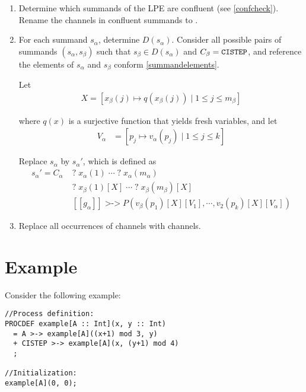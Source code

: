 \begin{enumerate}

\item Determine which \istep{} summands of the LPE are confluent (see \ref{confcheck}).
Rename the \istep{} channels in confluent \istep{} summands to \cistep{}.

\item For each summand $s_\alpha$, determine $D(s_\alpha)$.
Consider all possible pairs of summands $(s_\alpha, s_\beta)$ such that $s_\beta \in D(s_\alpha)$ and $C_\beta = \texttt{CISTEP}{}$, and reference the elements of $s_\alpha$ and $s_\beta$ conform \ref{summandelements}.

Let
\begin{align*}
X = [ x_\beta(j) \mapsto q(x_\beta(j)) \;|\; 1 \leq j \leq m_\beta ]
\end{align*}

where $q(x)$ is a surjective function that yields fresh variables, and let
\begin{align*}
V_\alpha &= [p_j \mapsto v_\alpha(p_j) \;|\; 1 \leq j \leq k]
\end{align*}

Replace $s_\alpha$ by ${s_\alpha}'$, which is defined as
\begin{align*}
{s_\alpha}' = C_\alpha \; &\texttt{?} \; x_\alpha(1) \; \cdots{} \; \texttt{?} \; x_\alpha(m_\alpha) \\
&\texttt{?} \; x_\beta(1)[X] \; \cdots{} \; \texttt{?} \; x_\beta(m_\beta)[X] \\
&[[g_\alpha]] \; \texttt{>->} \; P(v_\beta(p_1)[X][V_1], \cdots{}, v_2(p_k)[X][V_\alpha])
\end{align*}

\item Replace all occurrences of \cistep{} channels with \istep{} channels.
\end{enumerate}

\section{Example}

Consider the following example:

\begin{lstlisting}
//Process definition:
PROCDEF example[A :: Int](x, y :: Int)
  = A >-> example[A]((x+1) mod 3, y)
  + CISTEP >-> example[A](x, (y+1) mod 4)
  ;

//Initialization:
example[A](0, 0);
\end{lstlisting}

